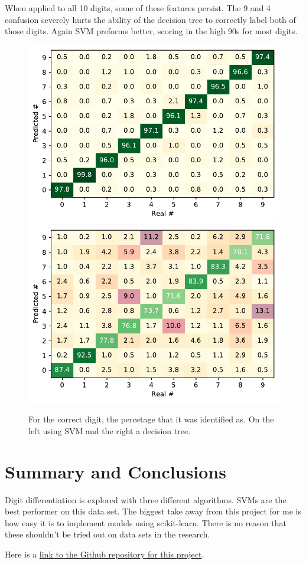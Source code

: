\documentclass{article}
\begin{document}
    When applied to all 10 digits, some of these features persist. The 9 and 4
    confusion severely hurts the ability of the decision tree to correctly label
    both of those digits. Again SVM preforms better, scoring in the high 90s
    for most digits.
    \begin{figure}[tbp]
        \centering
        \includegraphics[width=.49\textwidth]{SVC-classification.pdf}
        \includegraphics[width=.49\textwidth]{DecisionTreeClassifier-classification.pdf}
        \caption{\label{fig:ten-digit} For the correct digit, the percetage
        that it was identified as. On the left using SVM and the right a
        decision tree.}
    \end{figure}

    \section{Summary and Conclusions}
    Digit differentiation is explored with three different algorithms. SVMs are
    the best performer on this data set. The biggest take away from this project
    for me is how easy it is to implement models using scikit-learn. There is no
    reason that these shouldn't be tried out on data sets in the research.

    
    

    \FloatBarrier
    \newpage
    \appendix
    Here is a \href{https://github.com/bagriffith/AMATH582/tree/main/HW4}
    {link to the Github repository for this project}.
\end{document}
